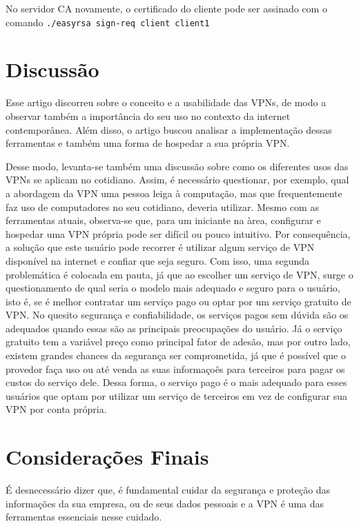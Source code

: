 \documentclass[12pt]{article}
\begin{document}
\begin{flushleft}
No servidor CA novamente, o certificado do cliente pode ser assinado com o comando \texttt{./easyrsa sign-req client client1}




\section{Discussão}

Esse artigo discorreu sobre o conceito e a usabilidade das VPNs, de modo a observar também a importância
do seu uso no contexto da internet contemporânea. Além disso, o artigo buscou analisar a implementação
dessas ferramentas e também uma forma de hospedar a sua própria VPN.

Desse modo, levanta-se também uma discussão sobre como os diferentes usos das VPNs se aplicam no cotidiano.
Assim, é necessário questionar, por exemplo, qual a abordagem da VPN uma pessoa leiga à
computação, mas que frequentemente faz uso de computadores no seu cotidiano, deveria utilizar.
Mesmo com as ferramentas atuais, observa-se que, para um iniciante na àrea, configurar e hospedar
uma VPN própria pode ser difícil ou pouco intuitivo.
Por consequência, a solução que este usuário pode recorrer é utilizar algum serviço de VPN disponível
na internet e confiar que seja seguro. 
Com isso, uma segunda problemática é colocada em pauta, já que ao escolher um serviço de VPN, 
surge o questionamento de qual seria o modelo mais adequado e seguro para o usuário, isto é, se é melhor
contratar um serviço pago ou optar por um serviço gratuito de VPN.
No quesito segurança e confiabilidade, os serviços pagos sem dúvida são os adequados quando essas
são as principais preocupações do usuário.
Já o serviço gratuito tem a variável preço como principal fator de adesão, mas por outro lado, existem
grandes chances da segurança ser comprometida, já que é possível que o provedor faça uso ou até venda
as suas informaçoês para terceiros para pagar os custos do serviço dele.
Dessa forma, o serviço pago é o mais adequado para esses usuários que optam por utilizar um serviço de
terceiros em vez de configurar sua VPN por conta própria. 


\section{Considerações Finais}

É desnecessário dizer que, é fundamental cuidar da segurança e proteção das informações da sua empresa, ou de seus dados pessoais e a VPN é uma das ferramentas essenciais nesse cuidado.


\end{flushleft}
\end{document}
